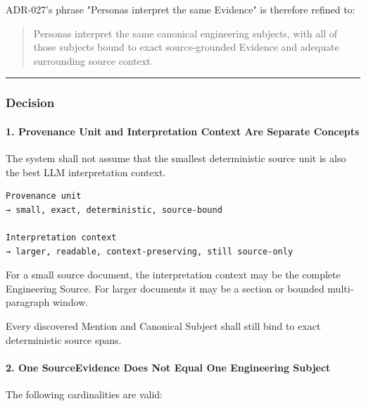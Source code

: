ADR-027's phrase "Personas interpret the same Evidence" is therefore refined to:

\begin{quote}
Personas interpret the same canonical engineering subjects, with all of those subjects bound to exact source-grounded Evidence and adequate surrounding source context.
\end{quote}

\begin{center}\rule{0.5\linewidth}{0.5pt}\end{center}

\hypertarget{decision-14}{%
\subsubsection{Decision}\label{decision-14}}

\hypertarget{1-provenance-unit-and-interpretation-context-are-separate-concepts}{%
\paragraph{1. Provenance Unit and Interpretation Context Are Separate Concepts}\label{1-provenance-unit-and-interpretation-context-are-separate-concepts}}

The system shall not assume that the smallest deterministic source unit is also the best LLM interpretation context.

\begin{verbatim}
Provenance unit
→ small, exact, deterministic, source-bound

Interpretation context
→ larger, readable, context-preserving, still source-only
\end{verbatim}

For a small source document, the interpretation context may be the complete Engineering Source. For larger documents it may be a section or bounded multi-paragraph window.

Every discovered Mention and Canonical Subject shall still bind to exact deterministic source spans.

\hypertarget{2-one-sourceevidence-does-not-equal-one-engineering-subject}{%
\paragraph{2. One SourceEvidence Does Not Equal One Engineering Subject}\label{2-one-sourceevidence-does-not-equal-one-engineering-subject}}

The following cardinalities are valid:

